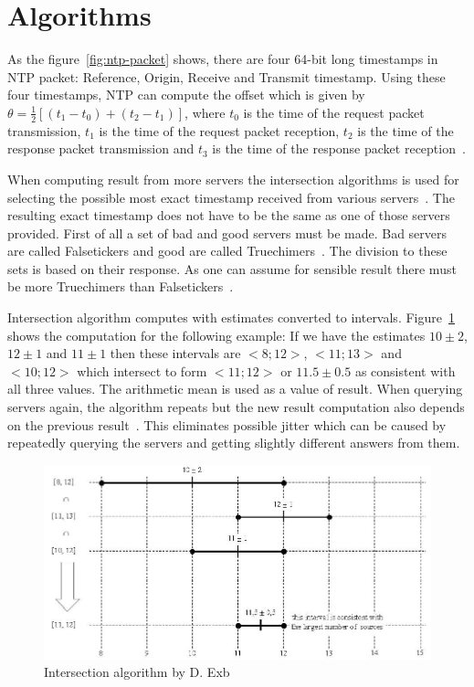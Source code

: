 
\section{Algorithms}
As the figure~\ref{fig:ntp-packet} shows, there are four 64-bit long timestamps
in NTP packet: Reference, Origin, Receive and Transmit timestamp.
Using these four timestamps, NTP can compute
the offset which is given by $\theta = \frac{1}{2}[(t_1 - t_0) + (t_2 - t_1)]$,
where $t_0$ is the time of the request packet transmission,
$t_1$ is the time of the request packet reception,
$t_2$ is the time of the response packet transmission and
$t_3$ is the time of the response packet reception~\cite{ntp-algor}.


When computing result from more servers the intersection algorithms is used
for selecting the possible most exact timestamp received from various servers~\cite{rfc5905}.
The resulting exact timestamp does not have to be the same
as one of those servers provided.
First of all a set of bad and good servers must be made.
Bad servers are called Falsetickers and good are called Truechimers~\cite{rfc5905}.
The division to these sets is based on their response.
As one can assume for sensible result there must be more Truechimers than Falsetickers~\cite{rfc5905}.

Intersection algorithm computes with estimates converted to intervals.
Figure~\ref{fig:ntp-intersection} shows the computation for the following example:
If we have the estimates $10 \pm 2$, $12 \pm 1$ and $11 \pm 1$
then these intervals are $<8; 12>$, $<11; 13>$ and $<10; 12>$ which
intersect to form $<11; 12>$ or $11.5 \pm 0.5$ as consistent with all three values.
The arithmetic mean is used as a value of result.
When querying servers again, the algorithm repeats but the new result computation
also depends on the previous result~\cite{rfc5905}.
This eliminates possible jitter which can be caused by repeatedly querying the servers
and getting slightly different answers from them.

\begin{figure}
	\centering
	\includegraphics[width=13cm,keepaspectratio]{fig/Marzullo_example-1.jpg}
	\caption{Intersection algorithm by D. Exb}
	\label{fig:ntp-intersection}
	\bigskip
\end{figure}

